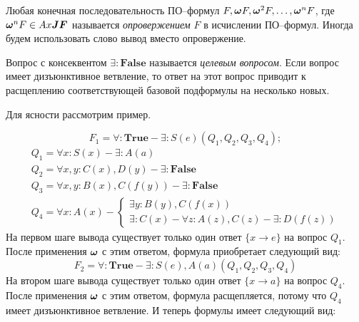 %
Любая конечная последовательность ПО--формул $F, \boldsymbol{\omega} F, \boldsymbol{\omega}^2 F,\ldots,\boldsymbol{\omega}^n F$, где $\boldsymbol{\omega}^n F \in Ax\boldsymbol{JF}$ называется {\em опровержением} $F$ в исчислении ПО--формул. Иногда будем использовать слово вывод вместо опровержение.

Вопрос с консеквентом $\exists:\boldsymbol{False}$ называется {\em целевым вопросом}. Если вопрос имеет дизъюнктивное ветвление, то ответ на этот вопрос приводит к расщеплению соответствующей базовой подформулы на несколько новых.

Для ясности рассмотрим пример.

\begin{example}\label{proofexample}


\begin{equation*}\label{ex:f1}
	F_1 = \forall\colon\boldsymbol{True} - \exists\colon S(e)(Q_1,Q_2,Q_3,Q_4);
\end{equation*}
\begin{equation*}
	\begin{array}{l}
	Q_1 = \forall x\colon S(x) - \exists\colon A(a) \\
	Q_2 = \forall x,y\colon C(x),D(y) - \exists\colon\boldsymbol{False} \\
	Q_3 = \forall x,y\colon B(x),C(f(y)) - \exists\colon\boldsymbol{False} \\
	Q_4 =
	\forall x\colon A(x) -
	\left\lbrace
	\begin{array}{l}
		\exists y\colon B(y),C(f(x)) \\
		\exists \colon C(x) - \forall z\colon A(z),C(z) - \exists\colon D(f(z))
	\end{array}\right.
	\end{array}
\end{equation*}
На первом шаге вывода существует только один ответ $\{x \rightarrow e\}$ на вопрос $Q_1$. После применения $\boldsymbol{\omega}$ с этим ответом, формула приобретает следующий вид:
\begin{equation*}\label{ex:f2}
	F_2 = \forall\colon\boldsymbol{True} - \exists\colon S(e),A(a)(Q_1,Q_2,Q_3,Q_4)
\end{equation*}
На втором шаге вывода существует только один ответ $\{x \rightarrow a\}$ на вопрос $Q_4$. После применения $\boldsymbol{\omega}$ с этим ответом, формула расщепляется, потому что $Q_4$ имеет дизъюнктивное ветвление. И теперь формулы имеет следующий вид:


\end{example}
